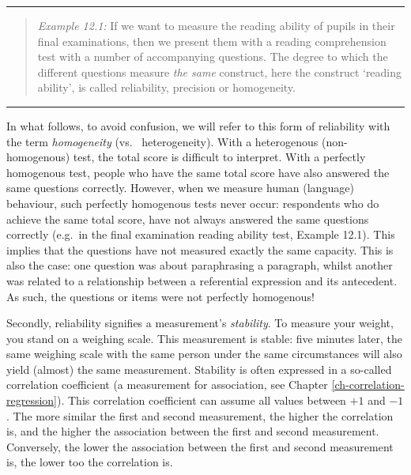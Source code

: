 \documentclass[
]{book}
\begin{document}
\begin{center}\rule{0.5\linewidth}{0.5pt}\end{center}

\begin{quote}
\emph{Example 12.1:} If we want to measure the reading ability
of pupils in their final examinations, then we present them
with a reading comprehension test with a number of accompanying questions.
The degree to which the different questions measure \emph{the same} construct, here the
construct `reading ability', is called reliability, precision or
homogeneity.
\end{quote}

\begin{center}\rule{0.5\linewidth}{0.5pt}\end{center}

In what follows, to avoid confusion, we will refer to this form
of reliability with the term \emph{homogeneity} (vs.~
heterogeneity). With a heterogenous (non-homogenous) test, the total score
is difficult to interpret. With a perfectly homogenous test, people
who have the same total score have also answered the same questions correctly.
However, when we measure human (language) behaviour, such perfectly homogenous tests
never occur: respondents who do achieve the same total score, have not
always answered the same questions correctly (e.g.~in the final examination
reading ability test, Example 12.1). This implies that the questions have not
measured exactly the same capacity. This is also the case: one question was about
paraphrasing a paragraph, whilst another was related to a relationship between
a referential expression and its antecedent.\\
As such, the questions or items were not perfectly homogenous!

Secondly, reliability signifies a measurement's \emph{stability}.
To measure your weight, you stand on a weighing scale. This
measurement is stable: five minutes later, the same weighing scale with the same
person under the same circumstances will also yield (almost)
the same measurement. Stability is often expressed in a so-called
correlation coefficient (a measurement for association, see Chapter
\ref{ch-correlation-regression}). This correlation coefficient can assume all
values between \(+1\) and \(-1\). The more similar the first and second measurement,
the higher the correlation is, and the higher the association between the first and second
measurement. Conversely, the lower the association between the first and second
measurement is, the lower too the correlation is.
\end{document}
